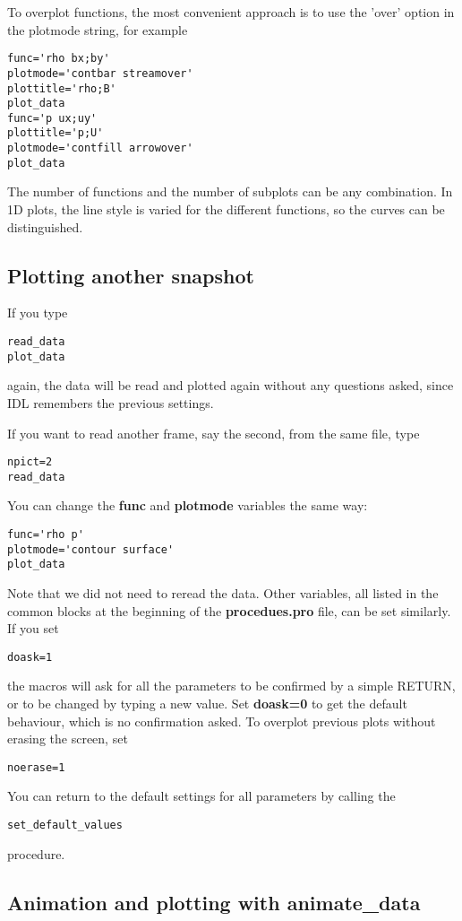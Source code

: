 \documentclass{article}
\begin{document}
To overplot functions, the most convenient approach
is to use the 'over' option in the plotmode string, for example
\begin{verbatim}
func='rho bx;by'
plotmode='contbar streamover'
plottitle='rho;B'
plot_data
func='p ux;uy'
plottitle='p;U'
plotmode='contfill arrowover'
plot_data
\end{verbatim}
The number of functions and the number of subplots can be any combination.
In 1D plots, the line style is varied for the different 
functions, so the curves can be distinguished.

\subsection{Plotting another snapshot \label{s-plot-another}}

   If you type
\begin{verbatim}
read_data
plot_data
\end{verbatim}
   again, the data will be read and plotted again without any questions asked,
   since IDL remembers the previous settings. 

   If you want to read another frame, say the second, from the same file, type
\begin{verbatim}
npict=2
read_data
\end{verbatim}
   You can change the {\bf func} and {\bf plotmode} variables the same way:
\begin{verbatim}
func='rho p'
plotmode='contour surface'
plot_data
\end{verbatim}
   Note that we did not need to reread the data.
   Other variables, all listed in the common blocks at the beginning of the
   {\bf procedues.pro} file, can be set similarly.
   If you set
\begin{verbatim}
doask=1
\end{verbatim}
   the macros will ask for all the parameters to be confirmed by a simple
   RETURN, or to be changed by typing a new value. Set {\bf doask=0} to
   get the default behaviour, which is no confirmation asked.
   To overplot previous plots without erasing the screen, set
\begin{verbatim}
noerase=1
\end{verbatim}
   You can return to the default settings for all parameters by calling the
\begin{verbatim}
set_default_values
\end{verbatim}
   procedure.

\subsection{Animation and plotting with animate\_data \label{s-animate}}
\end{document}
